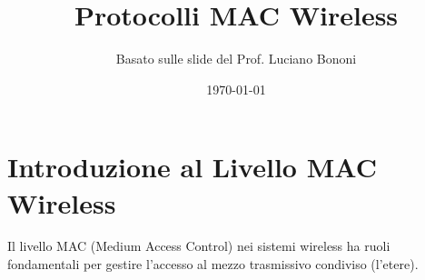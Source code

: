 


\title{Protocolli MAC Wireless}
\author{Basato sulle slide del Prof. Luciano Bononi}
\date{\today}



\maketitle
\tableofcontents
\newpage

\section{Introduzione al Livello MAC Wireless}
Il livello MAC (Medium Access Control) nei sistemi wireless ha ruoli fondamentali per gestire l'accesso al mezzo trasmissivo condiviso (l'etere).

